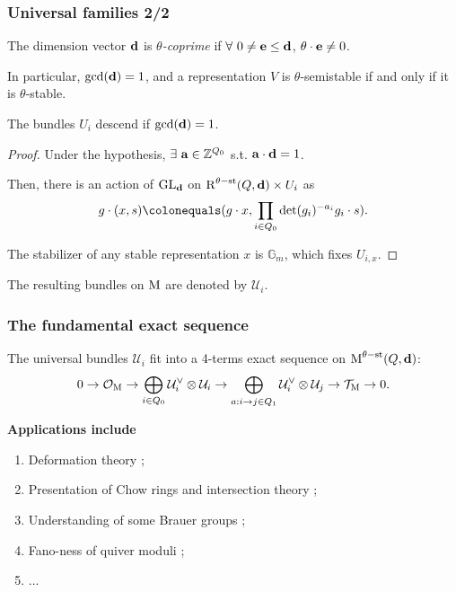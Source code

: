 \documentclass{beamer}
\begin{document}
\begin{frame}
    \frametitle{Universal families 2/2}
\begin{definition}
The dimension vector $\mathbf{d}$ is \emph{$\theta$-coprime} if
$\forall~ 0 \neq \mathbf{e} \leq \mathbf{d}$, $\theta \cdot \mathbf{e} \neq 0$.
\end{definition} \pause
In particular, $\gcd(\mathbf{d}) = 1$,
and a representation $V$ is $\theta$-semistable
if and only if it is $\theta$-stable. \pause

\begin{lemma}
    The bundles $U_i$ descend if $\gcd(\mathbf{d}) = 1$.
\end{lemma}\pause
\begin{proof}
Under the hypothesis, $\exists~\mathbf{a} \in \mathbb{Z}^{Q_0}$
s.t. $\mathbf{a} \cdot \mathbf{d} = 1$. \pause

Then, there is an action of $\operatorname{\operatorname{GL}_{\mathbf{d}}}$ on
$\operatorname{R}^{\theta-\mathrm{st}}(Q, \mathbf{d}) \times U_i$ as
\[g \cdot (x, s) \colonequals (g \cdot x, \prod_{i \in Q_0} \det(g_i)^{-a_i} g_i \cdot s). \] \pause

The stabilizer of any stable representation $x$ is $\mathbb{G}_m$, which fixes $U_{i, x}$.
\end{proof} \pause

The resulting bundles on $\operatorname{M}$ are denoted by $\mathcal{U}_i$.

\end{frame}
\begin{frame}
    \frametitle{The fundamental exact sequence}
The universal bundles $\mathcal{U}_i$ fit into a 4-terms exact sequence on $\operatorname{M}^{\theta-\mathrm{st}}(Q, \mathbf{d})$: \pause
\begin{equation}
\label{equation:4-term-exact-sequence}
0
\overset{}{\rightarrow}\mathcal{O}_{\operatorname{M}}
\overset{}{\rightarrow}\bigoplus_{i \in Q_0} \mathcal{U}^\vee_i \otimes \mathcal{U}_i
\overset{}{\rightarrow}\bigoplus_{a: i \overset{}{\rightarrow} j \in Q_1} \mathcal{U}^\vee_{i} \otimes \mathcal{U}_{j}
\overset{}{\rightarrow}\mathcal{T}_{\operatorname{M}}
\overset{}{\rightarrow} 0.
\end{equation} \pause

{\bf Applications include}
\begin{enumerate}
    \item Deformation theory \cite{belmans2023rigidity};
    \item Presentation of Chow rings \cite{Franzen2015} and intersection theory \cite{belmans2023chow};
    \item Understanding of some Brauer groups \cite{reineke2014brauer};
    \item Fano-ness of quiver moduli \cite{Franzen2020};
    \item ...
\end{enumerate}
\end{frame}
\end{document}
